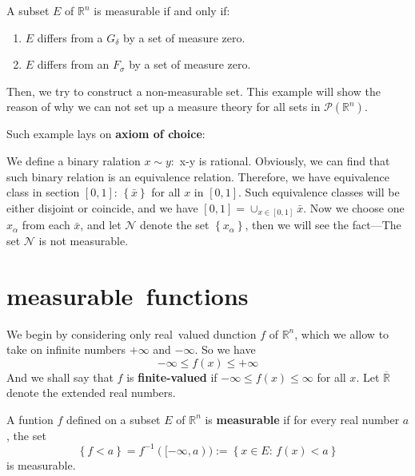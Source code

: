 \documentclass{ctexbook}
\begin{document}
\begin{cor}
    A subset $E$ of $\mathbb{R}^n $ is measurable if and only if:
    \begin{enumerate}
        \item $E$ differs from a $G_{\delta}$ by a set of measure zero.
        \item $E$ differs from an $F_{\sigma}$ by a set of measure zero.
    \end{enumerate}  
\end{cor}

Then, we try to construct a non-measurable set. This example will show the reason of why we can not set up a measure theory
for all sets in $\mathscr{P}(\mathbb{R}^n)$.

Such example lays on \textbf{axiom of choice}:
\begin{fact}
    We define a binary ralation $x\sim y:$ x-y is rational. Obviously, we can find that such binary relation is an equivalence
    relation. Therefore, we have equivalence class in section $[0,1]$: $\left\{\bar{x}\right\} $ for all $x$ in $[0,1]$. Such
    equivalence classes will be either disjoint or coincide, and we have $[0,1]=\cup_{x \in [0,1]}\bar{x}$. Now we
    choose one $x_\alpha$ from each $\bar{x}$, and let $\mathscr{N}$ denote the set $\left\{x_\alpha\right\}$, then we will see
    the fact---The set $\mathscr{N}$ is not measurable.
\end{fact}

\section{measurable~functions}

We begin by considering only real~valued dunction $f$ of $\mathbb{R}^n$, which we allow to take on infinite numbers $+\infty$ and 
$-\infty$. So we have \[-\infty \leq f(x) \leq +\infty\]And we shall say that $f$ is \textbf{finite-valued} if $-\infty \leq f(x) \leq \infty$
for all $x$. Let $\overline{\mathbb{R}}$ denote the extended real numbers.

\begin{define}
    A funtion $f$ defined on a subset $E$ of $\mathbb{R}^n$ is \textbf{measurable} if for every real number $a$, the set
    \[\left\{f < a\right\} =f^{-1}([-\infty,a)):= \left\{x \in E:\, f(x)<a\right\} \]
    is measurable.
\end{define}
\end{document}
